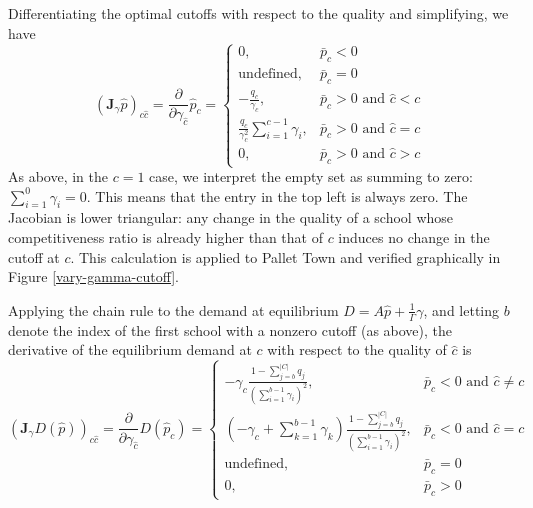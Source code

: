 \documentclass[12pt]{article}
\theoremstyle{definition}
\begin{document}
Differentiating the optimal cutoffs with respect to the quality and simplifying, we have
\begin{equation}\label{jac-gamma-p}
\left(\mathbf{J}_\gamma \hat p\right)_{c\hat c} =
\frac{\partial}{\partial\gamma_{\hat c}} \hat p_c = \begin{cases}
0, & \bar p_c < 0 \\
\text{undefined}, & \bar p_c = 0 \\
 - \frac{q_c}{\gamma_c}, & \bar p_c > 0 \text{ and }\hat c < c \\
\frac{q_c}{\gamma_c^2} \sum_{i=1}^{c-1} \gamma_i, & \bar p_c > 0 \text{ and }\hat c = c\\
0, & \bar p_c > 0 \text{ and }\hat c > c
\end{cases}
\end{equation}
As above, in the $c=1$ case, we interpret the empty set as summing to zero: $\sum_{i=1}^{0} \gamma_i = 0$. This means that the entry in the top left is always zero. The Jacobian is lower triangular: any change in the quality of a school whose competitiveness ratio is already higher than that of $c$ induces no change in the cutoff at $c$. This calculation is applied to Pallet Town and verified graphically in Figure \ref{vary-gamma-cutoff}.

Applying the chain rule to the demand at equilibrium $D = A \hat p + \frac{1}{\Gamma} \gamma$, and letting $b$ denote the index of the first school with a nonzero cutoff (as above), the derivative of the equilibrium demand at $c$ with respect to the quality of $\hat c$ is
\begin{equation} \label{jac-gamma-demand}
\left(\mathbf{J}_\gamma D\left(\hat p\right)\right)_{c\hat c} =
\frac{\partial}{\partial\gamma_{\hat c}} D(\hat p_c) = \begin{cases}
-\gamma_c \frac{1 - \sum_{j=b}^{|C|} q_j}{\left(\sum_{i=1}^{b-1} \gamma_i\right)^2}, & \bar p_c < 0 \text{ and }\hat c \neq c \\
\left(- \gamma_c + \sum_{k=1}^{b-1} \gamma_k\right)\frac{1 - \sum_{j=b}^{|C|} q_j}{\left(\sum_{i=1}^{b-1} \gamma_i\right)^2}, & \bar p_c < 0 \text{ and }\hat c = c\\
\text{undefined}, & \bar p_c = 0 \\
0, & \bar p_c > 0
\end{cases}
\end{equation}
\end{document}
